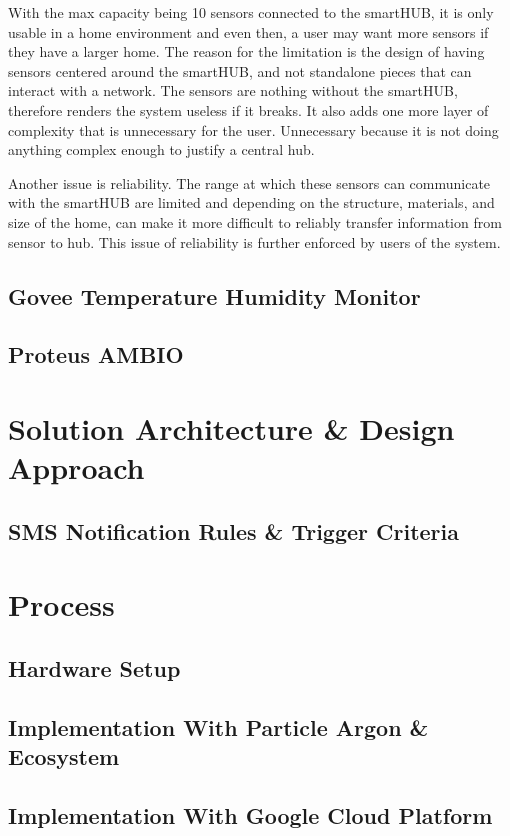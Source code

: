 \documentclass{article}
\begin{document}
With the max capacity being 10 sensors connected to the smartHUB, it is only usable in a home environment and even then, a user may want more sensors if they have a larger home. The reason for the limitation is the design of having sensors centered around the smartHUB, and not standalone pieces that can interact with a network. The sensors are nothing without the smartHUB, therefore renders the system useless if it breaks. It also adds one more layer of complexity that is unnecessary for the user. Unnecessary because it is not doing anything complex enough to justify a central hub.

Another issue is reliability. The range at which these sensors can communicate with the smartHUB are limited and depending on the structure, materials, and size of the home, can make it more difficult to reliably transfer information from sensor to hub. This issue of reliability is further enforced by users of the system.

\subsection{Govee Temperature Humidity Monitor}
\subsection{Proteus AMBIO}

\section{Solution Architecture \& Design Approach}
\subsection{SMS Notification Rules \& Trigger Criteria}
\section{Process}
\subsection{Hardware Setup}
\subsection{Implementation With Particle Argon \& Ecosystem}
\subsection{Implementation With Google Cloud Platform }
\end{document}
